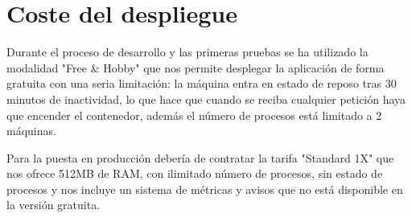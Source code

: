 \section{Coste del despliegue}
\label{sec:despliegue}

Durante el proceso de desarrollo y las primeras pruebas se ha utilizado la modalidad "Free & Hobby" que nos permite desplegar la aplicación de forma gratuita con una seria limitación: la máquina entra en estado de reposo tras 30 minutos de inactividad, lo que hace que cuando se reciba cualquier petición haya que encender el contenedor, además el número de procesos está limitado a 2 máquinas.

Para la puesta en producción debería de contratar la tarifa "Standard 1X" que nos ofrece 512MB de RAM, con ilimitado número de procesos, sin estado de procesos y nos incluye un sistema de métricas y avisos que no está disponible en la versión gratuita.

